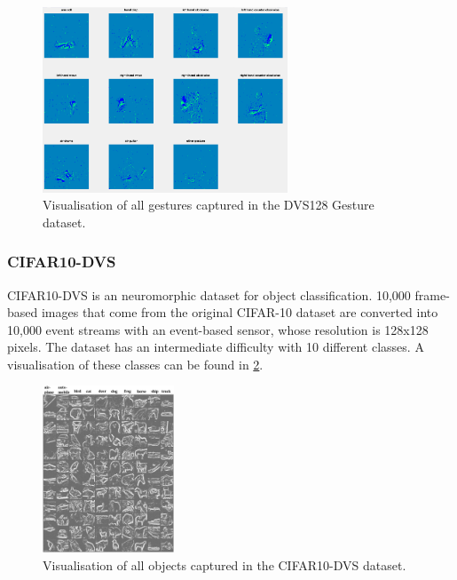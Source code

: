 \begin{figure}[htb]
      \centering
      \includegraphics[width=0.65\textwidth]{background/images/dvs128_gestures.png}
      \caption{Visualisation of all gestures captured in the DVS128 Gesture dataset\cite{DVS128}.}
      \label{fig:dvs128_gestures}
\end{figure}

\subsubsection{CIFAR10-DVS} \label{sssec:cifar10_dvs}

CIFAR10-DVS\cite{CIFAR10DVS} is an neuromorphic dataset for object classification. 10,000 frame-based images that come from the original CIFAR-10 dataset are converted into 10,000 event streams with an event-based sensor, whose resolution is 128x128 pixels. The dataset has an intermediate difficulty with 10 different classes. A visualisation of these classes can be found in \cref{fig:cifar10_objects}.

\begin{figure}[htb]
      \centering
      \includegraphics[width=0.35\textwidth]{background/images/cifar10_objects.jpg}
      \caption{Visualisation of all objects captured in the CIFAR10-DVS dataset\cite{CIFAR10DVS}.}
      \label{fig:cifar10_objects}
\end{figure}

